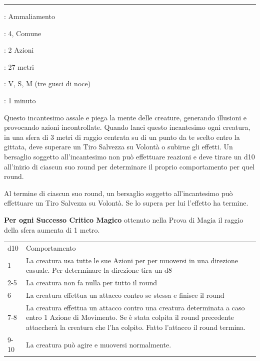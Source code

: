 \begin{multicols}{2}
\smallskip\noindent\rule{\linewidth}{2pt} \hypertarget{Confusione}{}\smallskip{}\hypertarget{incconfusione}{}\label{incconfusione}
\noindent
\begin{description}[noitemsep, topsep=0pt, parsep=0pt, partopsep=0pt, leftmargin=0cm, labelwidth=2.8cm]
	\item[\textbf{Lista di Magia}]: Ammaliamento
	\item[\textbf{Livello}]: 4, Comune
	\item[\textbf{T. di Lancio}]: 2 Azioni
	\item[\textbf{Gittata}]: 27 metri
	\item[\textbf{Componenti}]: V, S, M (tre gusci di noce)
	\item[\textbf{Durata}]: 1 minuto
\end{description}

Questo incantesimo assale e piega la mente delle creature, generando illusioni e provocando azioni incontrollate. Quando lanci questo incantesimo ogni creatura, in una sfera di 3 metri di raggio centrata su di un punto da te scelto entro la gittata, deve superare un Tiro Salvezza su Volontà o subirne gli effetti. Un bersaglio soggetto all'incantesimo non può effettuare reazioni e deve tirare un d10 all'inizio di ciascun suo round per determinare il proprio comportamento per quel round.

Al termine di ciascun suo round, un bersaglio soggetto all'incantesimo può effettuare un Tiro Salvezza su Volontà. Se lo supera per lui l'effetto ha termine.

\textbf{Per ogni Successo Critico Magico} ottenuto nella Prova di Magia il raggio della sfera aumenta di 1 metro.

\medskip

\begin{tabularx}{0.45\textwidth}{lX}
	\hline
	d10 & Comportamento\\
	1 & La creatura usa tutte le sue Azioni per per muoversi in una direzione casuale. Per determinare la direzione tira un d8\\
	2-5 & La creatura non fa nulla per tutto il round\\
	6 & La creatura effettua un attacco contro se stessa e finisce il round\\
	7-8 & La creatura effettua un attacco contro una creatura determinata a caso entro 1 Azione di Movimento. Se è stata colpita il round precedente attaccherà la creatura che l'ha colpito. Fatto l'attacco il round termina.\\
	9-10 & La creatura può agire e muoversi normalmente.
\end{tabularx}


\end{multicols}
